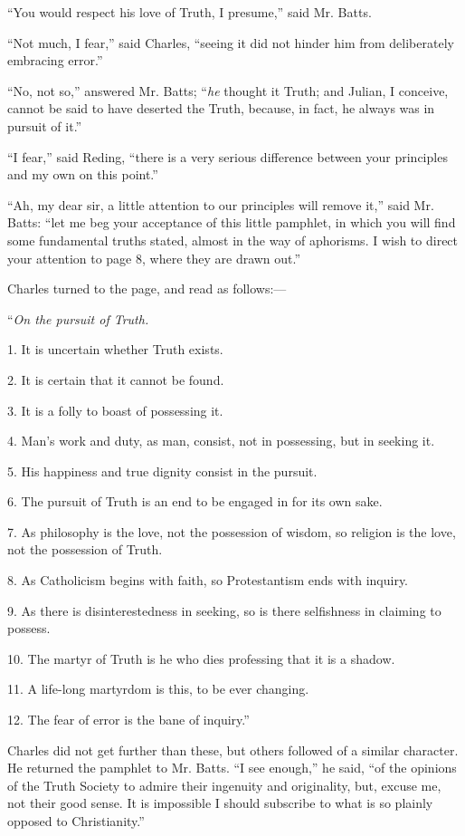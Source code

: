 ``You would respect his love of Truth, I presume,'' said
Mr. Batts.

``Not much, I fear,'' said Charles, ``seeing it did not
hinder him from deliberately embracing error.''

``No, not so,'' answered Mr. Batts; ``\emph{he} thought
it Truth; and Julian, I conceive, cannot be said to have deserted the
Truth, because, in fact, he always was in pursuit of it.''

``I fear,'' said Reding, ``there is a very serious
difference between your principles and my own on this point.''

``Ah, my dear sir, a little attention to our principles will
remove it,'' said Mr. Batts: ``let me beg your acceptance of
this little pamphlet, in which you will find some fundamental truths
stated, almost in the way of aphorisms. I wish to direct your
attention to page 8, where they are drawn out.''

Charles turned to the page, and read as follows:—

``\emph{On the pursuit of Truth.}

1. It is uncertain whether Truth exists.

2. It is certain that it cannot be found.

3. It is a folly to boast of possessing it.

4. Man's work and duty, as man, consist, not in possessing, but in
seeking it.

5. His happiness and true dignity consist in the pursuit.

6. The pursuit of Truth is an end to be engaged in for its own
sake.

7. As philosophy is the love, not the possession of wisdom, so
religion is the love, not the possession of Truth.

8. As Catholicism begins with faith, so Protestantism ends with
inquiry.

9. As there is disinterestedness in seeking, so is there
selfishness in claiming to possess.

10. The martyr of Truth is he who dies professing that it is a
shadow.

11. A life-long martyrdom is this, to be ever changing.

12. The fear of error is the bane of inquiry.''

Charles did not get further than these, but others followed of a
similar character. He returned the pamphlet to Mr. Batts. ``I see
enough,'' he said, ``of the opinions of the Truth Society to
admire their ingenuity and originality, but, excuse me, not their good
sense. It is impossible I should subscribe to what is so plainly
opposed to Christianity.''

